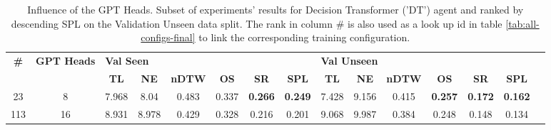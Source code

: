 \begin{table}
\centering
\caption{\label{tab:dt_heads}Influence of the GPT Heads. Subset of experiments' results for Decision Transformer ('DT') agent and ranked by descending SPL on the Validation Unseen data split. The rank in column \# is also used as a look up id in table \ref{tab:all-configs-final} to link the corresponding training configuration.}
\begin{tabular}{@{\hskip3pt}c@{\hskip3pt}c@{\hskip3pt}c@{\hskip3pt}c@{\hskip3pt}c@{\hskip3pt}c@{\hskip3pt}c@{\hskip3pt}c@{\hskip3pt}c@{\hskip3pt}c@{\hskip3pt}c@{\hskip3pt}c@{\hskip3pt}c@{\hskip3pt}c@{\hskip3pt}c}
\toprule
\textbf{\#} & \textbf{GPT Heads} & \multicolumn{6}{l}{\textbf{Val Seen}} & \multicolumn{6}{l}{\textbf{Val Unseen}} \\
 \textbf{~} &         \textbf{~} &       \textbf{TL} & \textbf{NE} & \textbf{nDTW} & \textbf{OS} &     \textbf{SR} &    \textbf{SPL} &         \textbf{TL} & \textbf{NE} & \textbf{nDTW} &     \textbf{OS} &     \textbf{SR} &    \textbf{SPL} \\
\midrule
         23 &                  8 &             7.968 &        8.04 &         0.483 &       0.337 &  \textbf{0.266} &  \textbf{0.249} &               7.428 &       9.156 &         0.415 &  \textbf{0.257} &  \textbf{0.172} &  \textbf{0.162} \\
        113 &                 16 &             8.931 &       8.978 &         0.429 &       0.328 &           0.216 &           0.201 &               9.068 &       9.987 &         0.384 &           0.248 &           0.148 &           0.134 \\
\bottomrule
\end{tabular}
\end{table}
